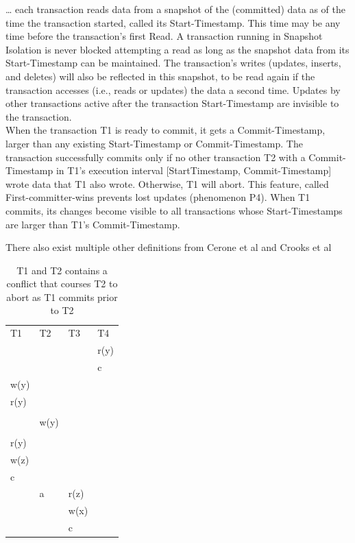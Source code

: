 \documentclass[a4paper,10pt,titlepage]{report}
\begin{document}
\begin{displayquote}
… each transaction reads data from a snapshot of the (committed) data as of the time the transaction started, called its Start-Timestamp. This time may be any time before the transaction's first Read. A transaction running in Snapshot Isolation is never blocked attempting a read as long as the snapshot data from its Start-Timestamp can be maintained. The transaction's writes (updates, inserts, and deletes) will also be reflected in this snapshot, to be read again if the transaction accesses (i.e., reads or updates) the data a second time. Updates by other transactions active after the transaction Start-Timestamp are invisible to the transaction.
\\
When the transaction T1 is ready to commit, it gets a Commit-Timestamp, larger than any existing Start-Timestamp or Commit-Timestamp. The transaction successfully commits only if no other transaction T2 with a Commit-Timestamp in T1's execution interval [StartTimestamp, Commit-Timestamp] wrote data that T1 also wrote. Otherwise, T1 will abort. This feature, called First-committer-wins prevents lost updates (phenomenon P4). When T1 commits, its changes become visible to all transactions whose Start-Timestamps are larger than T1's Commit-Timestamp.
\end{displayquote}


There also exist multiple other definitions from Cerone et al \cite{CeroneBernardiGotsman} and Crooks et al\cite{CrooksPuAlvisiClement}


\begin{table}[h]
    \begin{tabular}{l|l|l|l}
        T1   & T2   & T3   & T4   \\
        &      &      & r(y) \\
        &      &      & c    \\
        w(y) &      &      &      \\
        r(y) &      &      &      \\
        &      &      &      \\
        & w(y) &      &      \\
        &      &      &      \\
        r(y) &      &      &      \\
        w(z) &      &      &      \\
        c    &      &      &      \\
        & a    & r(z) &      \\
        &      & w(x) &      \\
        &      & c    &
    \end{tabular}
    \caption{T1 and T2 contains a conflict that courses T2 to abort as T1 commits prior to T2}
\end{table}
\end{document}
